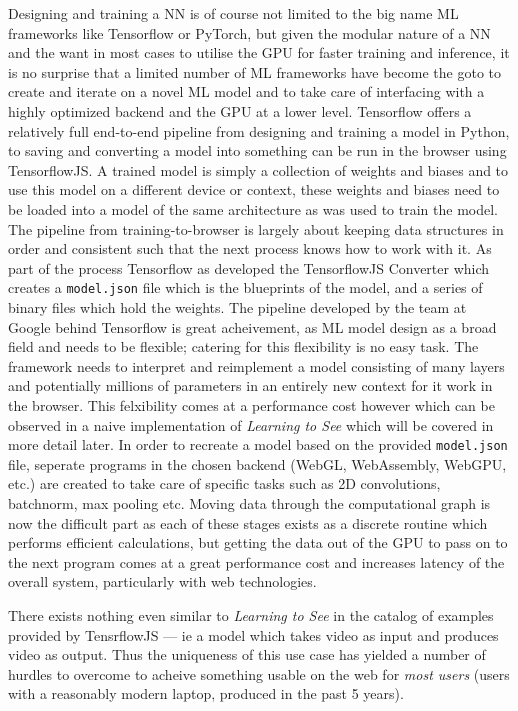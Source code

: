 \documentclass[a4paper]{article}
\begin{document}
Designing and training a NN is of course not limited to the big name ML frameworks like Tensorflow\cite{tf} or PyTorch\cite{pytorch}, but given the modular nature of a NN and the want in most cases to utilise the GPU for faster training and inference, it is no surprise that a limited number of ML frameworks have become the goto to create and iterate on a novel ML model and to take care of interfacing with a highly optimized backend and the GPU at a lower level. Tensorflow offers a relatively full end-to-end pipeline from designing and training a model in Python, to saving and converting a model into something can be run in the browser using TensorflowJS\cite{tfjs}. A trained model is simply a collection of weights and biases and to use this model on a different device or context, these weights and biases need to be loaded into a model of the same architecture as was used to train the model. The pipeline from training-to-browser is largely about keeping data structures in order and consistent such that the next process knows how to work with it. As part of the process Tensorflow as developed the TensorflowJS Converter\cite{tfjs_converter} which creates a \verb|model.json| file which is the blueprints of the model, and a series of binary files which hold the weights. The pipeline developed by the team at Google behind Tensorflow is great acheivement, as ML model design as a broad field and needs to be flexible; catering for this flexibility is no easy task. The framework needs to interpret and reimplement a model consisting of many layers and potentially millions of parameters in an entirely new context for it work in the browser. This felxibility comes at a performance cost however which can be observed in a naive implementation of \textit{Learning to See} which will be covered in more detail later. In order to recreate a model based on the provided \verb|model.json| file, seperate programs in the chosen backend (WebGL, WebAssembly, WebGPU, etc.) are created to take care of specific tasks such as 2D convolutions, batchnorm, max pooling etc. Moving data through the computational graph is now the difficult part as each of these stages exists as a discrete routine which performs efficient calculations, but getting the data out of the GPU to pass on to the next program comes at a great performance cost and increases latency of the overall system, particularly with web technologies\cite{optimizing_webgl}.

There exists nothing even similar to \textit{Learning to See} in the catalog of examples provided by TensrflowJS --- ie a model which takes video as input and produces video as output. Thus the uniqueness of this use case has yielded a number of hurdles to overcome to acheive something usable on the web for \textit{most users} (users with a reasonably modern laptop, produced in the past 5 years).
\end{document}
